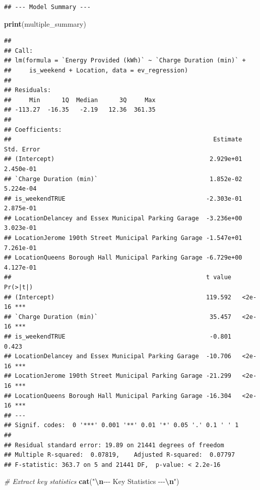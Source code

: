 \documentclass[
  12pt,
]{article}
\newenvironment{Shaded}{\begin{snugshade}}{\end{snugshade}}
\newcommand{\CommentTok}[1]{\textcolor[rgb]{0.56,0.35,0.01}{\textit{#1}}}
\newcommand{\FunctionTok}[1]{\textcolor[rgb]{0.13,0.29,0.53}{\textbf{#1}}}
\newcommand{\NormalTok}[1]{#1}
\newcommand{\SpecialCharTok}[1]{\textcolor[rgb]{0.81,0.36,0.00}{\textbf{#1}}}
\newcommand{\StringTok}[1]{\textcolor[rgb]{0.31,0.60,0.02}{#1}}
\begin{document}
\begin{verbatim}
## --- Model Summary ---
\end{verbatim}

\begin{Shaded}
\begin{Highlighting}[]
\FunctionTok{print}\NormalTok{(multiple\_summary)}
\end{Highlighting}
\end{Shaded}

\begin{verbatim}
## 
## Call:
## lm(formula = `Energy Provided (kWh)` ~ `Charge Duration (min)` + 
##     is_weekend + Location, data = ev_regression)
## 
## Residuals:
##     Min      1Q  Median      3Q     Max 
## -113.27  -16.35   -2.19   12.36  361.35 
## 
## Coefficients:
##                                                        Estimate Std. Error
## (Intercept)                                           2.929e+01  2.450e-01
## `Charge Duration (min)`                               1.852e-02  5.224e-04
## is_weekendTRUE                                       -2.303e-01  2.875e-01
## LocationDelancey and Essex Municipal Parking Garage  -3.236e+00  3.023e-01
## LocationJerome 190th Street Municipal Parking Garage -1.547e+01  7.261e-01
## LocationQueens Borough Hall Municipal Parking Garage -6.729e+00  4.127e-01
##                                                      t value Pr(>|t|)    
## (Intercept)                                          119.592   <2e-16 ***
## `Charge Duration (min)`                               35.457   <2e-16 ***
## is_weekendTRUE                                        -0.801    0.423    
## LocationDelancey and Essex Municipal Parking Garage  -10.706   <2e-16 ***
## LocationJerome 190th Street Municipal Parking Garage -21.299   <2e-16 ***
## LocationQueens Borough Hall Municipal Parking Garage -16.304   <2e-16 ***
## ---
## Signif. codes:  0 '***' 0.001 '**' 0.01 '*' 0.05 '.' 0.1 ' ' 1
## 
## Residual standard error: 19.89 on 21441 degrees of freedom
## Multiple R-squared:  0.07819,    Adjusted R-squared:  0.07797 
## F-statistic: 363.7 on 5 and 21441 DF,  p-value: < 2.2e-16
\end{verbatim}

\begin{Shaded}
\begin{Highlighting}[]
\CommentTok{\# Extract key statistics}
\FunctionTok{cat}\NormalTok{(}\StringTok{"}\SpecialCharTok{\textbackslash{}n}\StringTok{{-}{-}{-} Key Statistics {-}{-}{-}}\SpecialCharTok{\textbackslash{}n}\StringTok{"}\NormalTok{)}
\end{Highlighting}
\end{Shaded}
\end{document}
